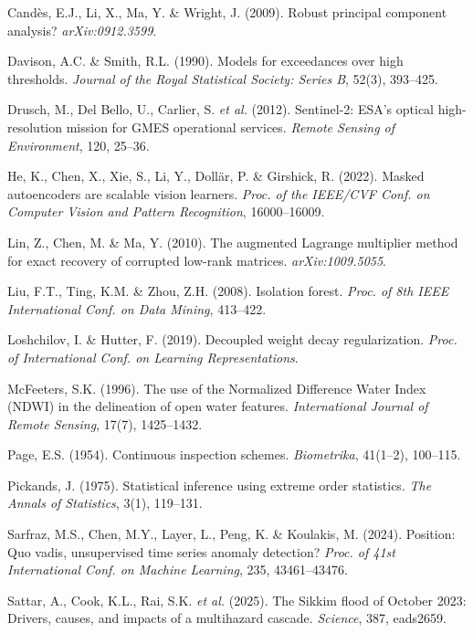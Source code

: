 \documentclass[10pt,twocolumn]{article}
\begin{document}
{\small\begin{list}{}{\setlength{\leftmargin}{1.4em}\setlength{\itemindent}{-1.4em}\setlength{\itemsep}{1.5pt}\setlength{\parsep}{0pt}\setlength{\topsep}{2pt}}
\item Cand\`es, E.J., Li, X., Ma, Y. \& Wright, J. (2009). Robust principal component analysis? \textit{arXiv:0912.3599}.
\item Davison, A.C. \& Smith, R.L. (1990). Models for exceedances over high thresholds. \textit{Journal of the Royal Statistical Society: Series B}, 52(3), 393--425.
\item Drusch, M., Del Bello, U., Carlier, S. \textit{et al.} (2012). Sentinel-2: ESA's optical high-resolution mission for GMES operational services. \textit{Remote Sensing of Environment}, 120, 25--36.
\item He, K., Chen, X., Xie, S., Li, Y., Doll\"ar, P. \& Girshick, R. (2022). Masked autoencoders are scalable vision learners. \textit{Proc. of the IEEE/CVF Conf. on Computer Vision and Pattern Recognition}, 16000--16009.
\item Lin, Z., Chen, M. \& Ma, Y. (2010). The augmented Lagrange multiplier method for exact recovery of corrupted low-rank matrices. \textit{arXiv:1009.5055}.
\item Liu, F.T., Ting, K.M. \& Zhou, Z.H. (2008). Isolation forest. \textit{Proc. of 8th IEEE International Conf. on Data Mining}, 413--422.
\item Loshchilov, I. \& Hutter, F. (2019). Decoupled weight decay regularization. \textit{Proc. of International Conf. on Learning Representations}.
\item McFeeters, S.K. (1996). The use of the Normalized Difference Water Index (NDWI) in the delineation of open water features. \textit{International Journal of Remote Sensing}, 17(7), 1425--1432.
\item Page, E.S. (1954). Continuous inspection schemes. \textit{Biometrika}, 41(1--2), 100--115.
\item Pickands, J. (1975). Statistical inference using extreme order statistics. \textit{The Annals of Statistics}, 3(1), 119--131.
\item Sarfraz, M.S., Chen, M.Y., Layer, L., Peng, K. \& Koulakis, M. (2024). Position: Quo vadis, unsupervised time series anomaly detection? \textit{Proc. of 41st International Conf. on Machine Learning}, 235, 43461--43476.
\item Sattar, A., Cook, K.L., Rai, S.K. \textit{et al.} (2025). The Sikkim flood of October 2023: Drivers, causes, and impacts of a multihazard cascade. \textit{Science}, 387, eads2659.

\end{list}}
\end{document}
